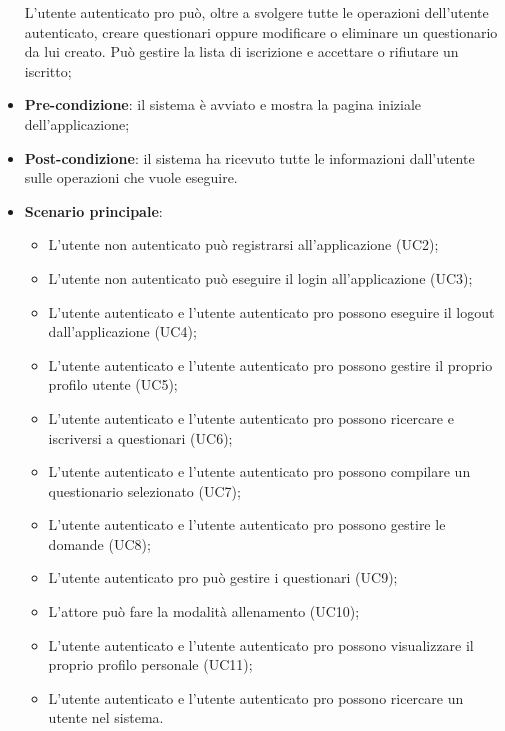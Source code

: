 \begin{itemize}
L'utente autenticato pro può, oltre a svolgere tutte le operazioni dell'utente autenticato, creare questionari oppure modificare o eliminare un questionario da lui creato. Può gestire la lista di iscrizione e accettare o rifiutare un iscritto;
\item\textbf{Pre-condizione}: il sistema è avviato e mostra la pagina iniziale dell'applicazione;
\item\textbf{Post-condizione}: il sistema ha ricevuto tutte le informazioni dall'utente sulle operazioni che vuole eseguire.
\item\textbf{Scenario principale}:
\begin{itemize}
\item L'utente non autenticato può registrarsi all'applicazione (UC2);
\item L'utente non autenticato può eseguire il login all'applicazione (UC3);
\item L'utente autenticato e l'utente autenticato pro possono eseguire il logout dall'applicazione (UC4); 
\item L'utente autenticato e l'utente autenticato pro possono gestire il proprio profilo utente (UC5);
\item L'utente autenticato e l'utente autenticato pro possono ricercare e iscriversi a questionari (UC6);
\item L'utente autenticato e l'utente autenticato pro possono compilare un questionario selezionato (UC7);
\item L'utente autenticato e l'utente autenticato pro possono gestire le domande (UC8);
\item L'utente autenticato pro può gestire i questionari (UC9);
\item L'attore può fare la modalità allenamento (UC10);
\item L'utente autenticato e l'utente autenticato pro possono visualizzare il proprio profilo personale (UC11);
\item L'utente autenticato e l'utente autenticato pro possono ricercare un utente nel sistema.
\end{itemize}
\end{itemize}